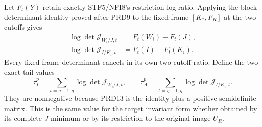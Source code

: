 Let $F_t(Y)$ retain exactly STF5/NFI8's restriction log ratio.
Applying the block determinant identity proved after PRD9 to
the fixed frame $[K_*,F_R]$ at the two cutoffs gives
\[
\begin{aligned}
 \log\det\mathcal J_{W_i/J,t}&=F_t(W_i)-F_t(J),\\
 \log\det\mathcal J_{I/K_i,t}&=F_t(I)-F_t(K_i).
\end{aligned}                                                    \tag{PRD15}
\]
Every fixed frame determinant cancels in its own two-cutoff
ratio. Define the two exact tail values
\[
 \tau_I^p=\sum_{t=q-1,q}\log\det\mathcal J_{W_i/J,t},\qquad
 \tau_A^p=\sum_{t=q-1,q}\log\det\mathcal J_{I/K_i,t}.
                                                               \tag{PRD16}
\]
They are nonnegative because PRD13 is the identity plus a positive
semidefinite matrix. This is the same value for the target invariant
form whether obtained by its complete $J$ minimum or by its
restriction to the original image $U_R$.

